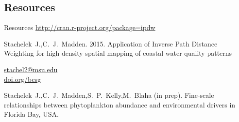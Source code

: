\documentclass[compress,noflama,nosectionpages]{beamer}
\begin{document}
\subsection{Resources}
\begin{frame}{Resources}
  \centering
  \url{http://cran.r-project.org/package=ipdw}
  \begin{thebibliography}{10}
  \beamertemplatearticlebibitems
	Stachelek~J.,C.~J.~Madden. 2015. Application of Inverse Path Distance Weighting for high-density spatial mapping of coastal water quality patterns
	\newblock {}
	
	\vspace{3pt}
	\begin{center}
	\url{stachel2@msu.edu}\\
	\url{doi.org/bcsg}
	\end{center}
	\vspace{3pt}
	
	Stachelek~J.,C.~J.~Madden,S.~P.~Kelly,M.~Blaha (in prep). Fine-scale relationships between phytoplankton abundance and environmental drivers in Florida Bay, USA.
  \end{thebibliography}

\end{frame}
\end{document}
